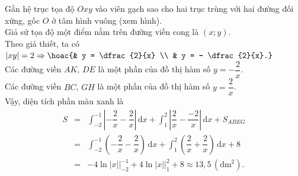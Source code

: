 \begin{bt}
{\begin{center}
		\end{center}
		Gắn hệ trục tọa độ $O xy$ vào viên gạch sao cho  hai trục trùng với hai đường đối xứng, gốc $O$ ở tâm hình vuông (xem hình).\\
		Giả sử tọa độ một  điểm nằm trên đường viền cong là $\left(x; y \right)$. \\
		 Theo giả thiết, ta có $|x y| =2 \Rightarrow \hoac{& y = \dfrac{2}{x} \\ & y = - \dfrac{2}{x}.}$ \\
		Các đường viền $AK$, $DE$ là một phần của đồ thị hàm số $y = - \dfrac{2}{x}$.  \\
		Các đường viền  $BC$, $GH$ là một phần của đồ thị hàm số $y = \dfrac{2}{x}$. \\
		Vậy,  diện tích phần màu xanh là
		\allowdisplaybreaks 
		\begin{eqnarray*}
			S &=&\displaystyle\int_{-2}^{-1} \left|-\dfrac{2}{x} - \dfrac{2}{x}\right| \mathrm{\, d}x + \displaystyle\int_{1}^{2} \left|\dfrac{2}{x} - \dfrac{- 2}{x}\right| \mathrm{\, d}x + S_{ABEG}\\ 
			&=&\displaystyle\int_{-2}^{-1} \left(-\dfrac{2}{x} - \dfrac{2}{x}\right) \mathrm{\, d}x + \displaystyle\int_{1}^{2} \left( \dfrac{2}{x} + \dfrac{2}{x}\right) \mathrm{\, d}x + 8  \\
			&=& - 4  \ln |x| \Bigr|^{-1}_{-2} + 4 \ln |x| \Bigr|^{2}_{1} +8 \approx 13{,}5\, \left( \mathrm{dm}^2 \right).
		\end{eqnarray*}
	 }
\end{bt}

